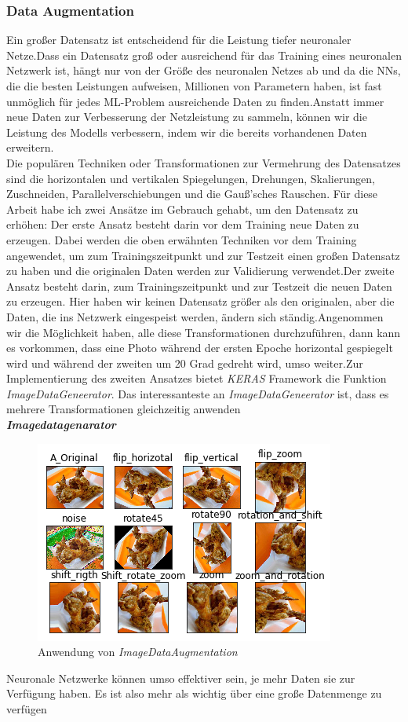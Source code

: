 \documentclass[12pt,a4paper]{scrartcl}
\numberwithin{equation}{section}
\begin{document}
 \subsubsection{Data Augmentation}
 Ein großer Datensatz ist entscheidend für die Leistung tiefer neuronaler Netze.Dass ein Datensatz groß oder ausreichend für das Training eines neuronalen Netzwerk ist, hängt nur von der Größe des neuronalen Netzes ab und da die \acsp{NN}, die die besten Leistungen aufweisen, Millionen von Parametern haben, ist fast unmöglich für jedes ML-Problem ausreichende Daten zu finden.Anstatt immer neue Daten zur Verbesserung der Netzleistung zu sammeln, können wir die Leistung des Modells verbessern, indem wir die bereits vorhandenen Daten erweitern.\\
 Die populären Techniken oder Transformationen zur Vermehrung des Datensatzes sind die horizontalen und vertikalen Spiegelungen, Drehungen, Skalierungen, Zuschneiden, Parallelverschiebungen und die Gauß'sches Rauschen.
 Für diese Arbeit habe ich zwei Ansätze im Gebrauch gehabt, um den Datensatz zu erhöhen:
 Der erste Ansatz besteht darin vor dem Training neue Daten zu erzeugen. Dabei werden die oben erwähnten Techniken vor dem Training angewendet, um zum Trainingszeitpunkt und zur Testzeit einen großen Datensatz zu haben und die originalen Daten werden zur Validierung verwendet.Der zweite Ansatz besteht darin, zum Trainingszeitpunkt und zur Testzeit die neuen Daten zu erzeugen. Hier haben wir keinen Datensatz größer als den originalen, aber die Daten, die ins Netzwerk eingespeist werden, ändern sich ständig.Angenommen wir die Möglichkeit haben, alle diese Transformationen durchzuführen, dann kann es vorkommen, dass eine Photo während der ersten Epoche horizontal gespiegelt wird und während der zweiten um  20 Grad gedreht wird, umso weiter.Zur Implementierung des zweiten Ansatzes bietet \textit{KERAS} Framework die Funktion \textit{ImageDataGeneerator}. Das interessanteste an \textit{ImageDataGeneerator} ist, dass es mehrere Transformationen gleichzeitig anwenden\\
 \textit{\textbf{Imagedatagenarator}}\\
 \begin{figure}[h]
 	\centering
 	\includegraphics{ImageDataAugmaentation.png}
 	\caption{Anwendung von \textit{ImageDataAugmentation} }
 	\label{fig:ImageDataAugmentation}
 \end{figure}
 Neuronale Netzwerke können umso effektiver sein, je mehr Daten sie zur Verfügung haben. Es ist also mehr als wichtig über eine große Datenmenge zu verfügen\\
 
\end{document}
